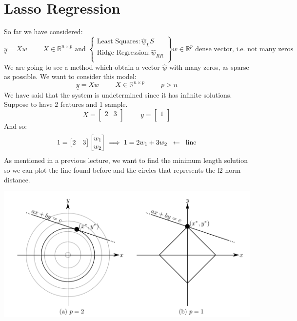 \section{Lasso Regression}
So far we have considered:
\[
    \underline{y} = X\underline{w} \hspace{1cm} X \in \mathbb{R}^{n \times p} \text{ and } \begin{Bmatrix}
        \text{Least Squares}: \underline{\hat{w}}_LS\\
        \text{Ridge Regression}: \underline{\hat{w}}_{RR}\\
    \end{Bmatrix} \underline{w} \in \mathbb{R}^p \text{ dense vector, i.e. not many zeros} 
\]
We are going to see a method which obtain a vector $\underline{\hat{w}}$ with many zeros, as sparse as possible. We want to consider this model:
\[
    \underline{y} = X\underline{w} \hspace{1cm} X \in \mathbb{R}^{n \times p} \hspace{1cm} p > n 
\]
We have said that the system is undetermined since it has infinite solutions. Suppose to have 2 features and 1 sample. 
\[
    X = \begin{bmatrix}
        2 & 3\\
    \end{bmatrix}
    \hspace{1cm}
    y = \begin{bmatrix}
        1\\
    \end{bmatrix}
\]
And so:
\[
    1 = \begin{bmatrix}
        2 & 3
    \end{bmatrix}\begin{bmatrix}
        w_1\\
        w_2
    \end{bmatrix} \implies
    1 = 2w_1 + 3w_2 \hspace{0.2cm} \leftarrow \hspace{0.2cm} \text{line}    
\]
As mentioned in a previous lecture, we want to find the minimum length solution so we can plot the line found before and the circles that represents the l2-norm distance.
\begin{center}
    \includegraphics[scale=0.6]{../images/LassoRidgePlot.png}
\end{center}
